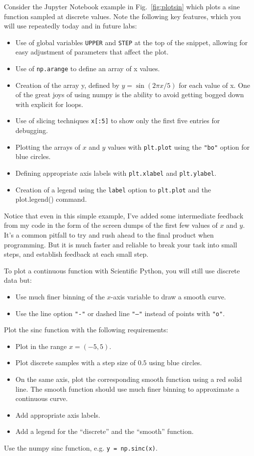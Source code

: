 Consider the Jupyter Notebook example in Fig.~\ref{fig:plotsin} which
plots a sine function sampled at discrete values.  Note the following
key features, which you will use repeatedly today and in future labs:
\begin{itemize}
\item Use of global variables {\tt UPPER} and {\tt STEP} at the top of the snippet, allowing for easy adjustment of parameters that affect the plot.
\item Use of {\tt np.arange} to define an array of x values.
\item Creation of the array y, defined by $y = \sin(2\pi x / 5)$ for each value of x.  One of the great joys of using numpy is the ability to avoid getting bogged down with explicit for loops.
\item Use of slicing techniques {\tt x[:5]} to show only the first five entries for debugging.  
\item Plotting the arrays of $x$ and $y$ values with {\tt plt.plot}  using the {\tt "bo"} option for blue circles.
\item Defining appropriate axis labels with {\tt plt.xlabel} and {\tt plt.ylabel}. 
\item Creation of a legend using the {\tt label} option to {\tt plt.plot} and the {plot.legend()} command.
\end{itemize}
Notice that even in this simple example, I've added some intermediate
feedback from my code in the form of the screen dumps of the first few
values of $x$ and $y$.  It's a common pitfall to try and rush ahead to
the final product when programming.  But it is much faster and
reliable to break your task into small steps, and establish feedback
at each small step.

To plot a continuous function with Scientific Python, you will still
use discrete data but:
\begin{itemize}
 \item Use much finer binning of the $x$-axis variable to draw a smooth curve. 
 \item Use the line option {\tt "-"} or dashed line {\tt "--"} instead of points with {\tt "o"}. 
\end{itemize} 

\noindent
\begin{plot} \end{plot}
Plot the sinc function with the following requirements:
\begin{itemize}
 \item Plot in the range $x = (-5,5)$.
 \item Plot discrete samples with a step size of $0.5$ using blue circles.
 \item On the same axis, plot the corresponding smooth function using
   a red solid line.  The smooth function should use much finer
   binning to approximate a continuous curve.
 \item Add appropriate axis labels. 
 \item Add a legend for the ``discrete'' and the ``smooth''  function.
\end{itemize}
Use the numpy sinc function, e.g. {\tt y = np.sinc(x)}.



